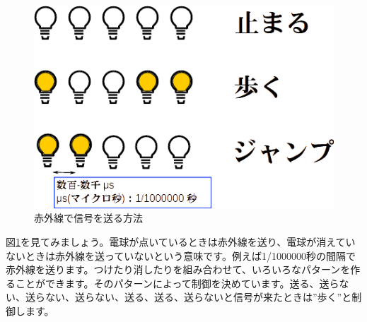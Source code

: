 \begin{figure}[H]
\centering
\includegraphics[scale=0.6]{images/chap05/text05-img037.png}
\caption{赤外線で信号を送る方法}
\label{ir}
\end{figure}

図\ref{ir}を見てみましょう。電球が点いているときは赤外線を送り、電球が消えていないときは赤外線を送っていないという意味です。例えば1/1000000秒の間隔で赤外線を送ります。つけたり消したりを組み合わせて、いろいろなパターンを作ることができます。そのパターンによって制御を決めています。送る、送らない、送らない、送らない、送る、送る、送らないと信号が来たときは”歩く”と制御します。